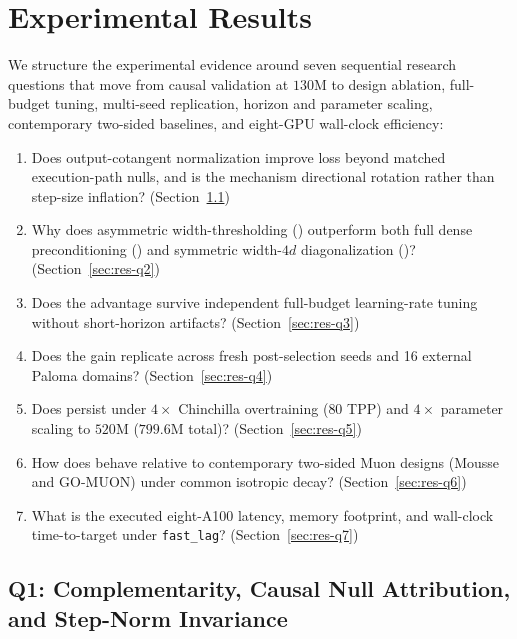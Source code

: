\section{Experimental Results}
\label{sec:results}

We structure the experimental evidence around seven sequential research
questions that move from causal validation at $130\text{M}$ to design
ablation, full-budget tuning, multi-seed replication, horizon and parameter
scaling, contemporary two-sided baselines, and eight-GPU wall-clock efficiency:
\begin{enumerate}
\item[\textbf{Q1}] Does output-cotangent normalization improve loss beyond
  matched execution-path nulls, and is the mechanism directional rotation rather
  than step-size inflation? (Section~\ref{sec:res-q1})
\item[\textbf{Q2}] Why does asymmetric width-thresholding ()
  outperform both full dense preconditioning () and symmetric
  width-$4d$ diagonalization ()? (Section~\ref{sec:res-q2})
\item[\textbf{Q3}] Does the advantage survive independent full-budget
  learning-rate tuning without short-horizon artifacts? (Section~\ref{sec:res-q3})
\item[\textbf{Q4}] Does the gain replicate across fresh post-selection seeds and
  16 external Paloma domains? (Section~\ref{sec:res-q4})
\item[\textbf{Q5}] Does  persist under $4\times$ Chinchilla
  overtraining ($80$ TPP) and $4\times$ parameter scaling to $520\text{M}$
  ($799.6\text{M}$ total)? (Section~\ref{sec:res-q5})
\item[\textbf{Q6}] How does  behave relative to contemporary
  two-sided Muon designs (Mousse and GO-MUON) under common isotropic decay?
  (Section~\ref{sec:res-q6})
\item[\textbf{Q7}] What is the executed eight-A100 latency, memory footprint,
  and wall-clock time-to-target under \texttt{fast\_lag}? (Section~\ref{sec:res-q7})
\end{enumerate}

\subsection{Q1: Complementarity, Causal Null Attribution, and Step-Norm Invariance}
\label{sec:res-q1}

